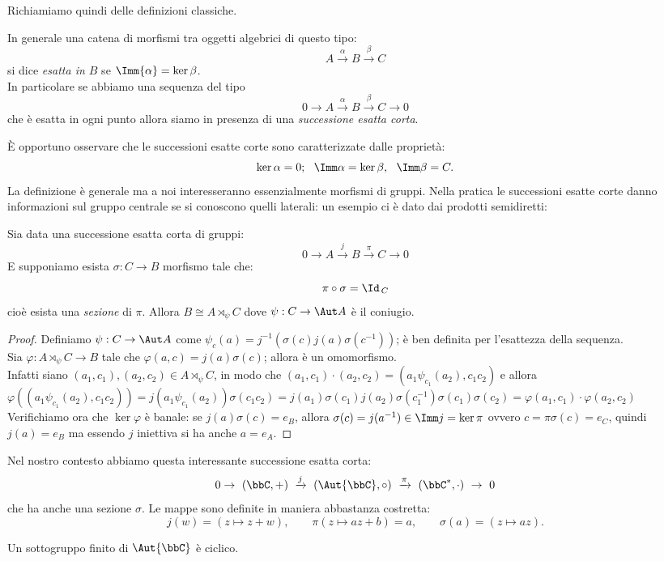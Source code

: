 Richiamiamo quindi delle definizioni classiche.

\begin{definizione} In generale una catena di morfismi tra oggetti algebrici di questo tipo:
$$ A\xrightarrow{\alpha}B\xrightarrow{\beta}C $$
si dice {\it esatta in $B$} se $\Imm{\alpha}=\ker{\beta}$.\\
In particolare se abbiamo una sequenza del tipo
$$ 0\rightarrow A\xrightarrow{\alpha}B\xrightarrow{\beta}C \rightarrow 0 $$
che è esatta in ogni punto allora siamo in presenza di una {\it successione esatta corta}.
\end{definizione}
È opportuno osservare che le successioni esatte corte sono caratterizzate dalle proprietà:
$$ \ker \alpha =0;\ \ \Imm\alpha =\ker\beta,\ \ \Imm\beta =C. $$
La definizione è generale ma a noi interesseranno essenzialmente morfismi di gruppi.
Nella pratica le successioni esatte corte danno informazioni sul gruppo centrale se si conoscono quelli laterali: un esempio ci è dato dai prodotti semidiretti:
\begin{fatto}
Sia data una successione esatta corta di gruppi:
$$ 0\rightarrow A\xrightarrow{j}B\xrightarrow{\pi}C \rightarrow 0 $$
E supponiamo esista $\sigma:C\rightarrow B$ morfismo tale che:
$$
\pi\circ \sigma=\Id_{\, C}
$$
cioè esista  una {\it sezione} di $\pi$. Allora $B\cong A\rtimes_\psi C$ dove $\psi:C
\rightarrow \Aut A$ è il coniugio.
\end{fatto}
\begin{proof}
    Definiamo $\psi: C\to \Aut A$ come $\psi_c(a)=j^{-1}\left( \sigma(c)j(a)\sigma(c^{-1}) \right)$; è ben definita per l'esattezza della sequenza.\\
    Sia $\varphi:A\rtimes_\psi C\to B$ tale che $\varphi(a,c)=j(a)\sigma(c)$; allora è un omomorfismo.\\
    Infatti siano $(a_1,c_1),(a_2,c_2)\in A\rtimes_\psi C$, in modo che $(a_1,c_1)\cdot(a_2,c_2)=(a_1\psi_{c_1}(a_2),c_1c_2)$ e allora $\varphi((a_1\psi_{c_1}(a_2),c_1c_2))=j(a_1\psi_{c_1}(a_2))\sigma(c_1c_2)=j(a_1)\sigma(c_1)j(a_2)\sigma(c_1^{-1})\sigma(c_1)\sigma(c_2)=\varphi(a_1,c_1)\cdot\varphi(a_2,c_2)$\\
    Verifichiamo ora che $\ker\varphi$ è banale: se $j(a)\sigma(c)=e_B$, allora $\sigma(c)=j(a^{-1})\in\Imm j=\ker \pi$ ovvero $c=\pi\sigma(c)=e_C$, quindi $j(a)=e_B$ ma essendo $j$ iniettiva si ha anche $a=e_A$.
\end{proof}

Nel nostro contesto abbiamo questa interessante successione esatta corta:
$$
0\rightarrow\ (\bbC,+)\ \xrightarrow{j}\ (\Aut{\bbC},\circ)\ \xrightarrow{\pi}\ (\bbC^*,\cdot)\  \rightarrow\ 0
$$
che ha anche una sezione $\sigma$. Le mappe sono definite in maniera abbastanza costretta:
$$
j(w)=(z\mapsto z+w),\qquad \pi(z\mapsto az+b)=a,\qquad \sigma(a)=(z\mapsto az).
$$
\begin{esercizio}
Un sottogruppo finito di $\Aut{\bbC}$ è ciclico.
\end{esercizio}

